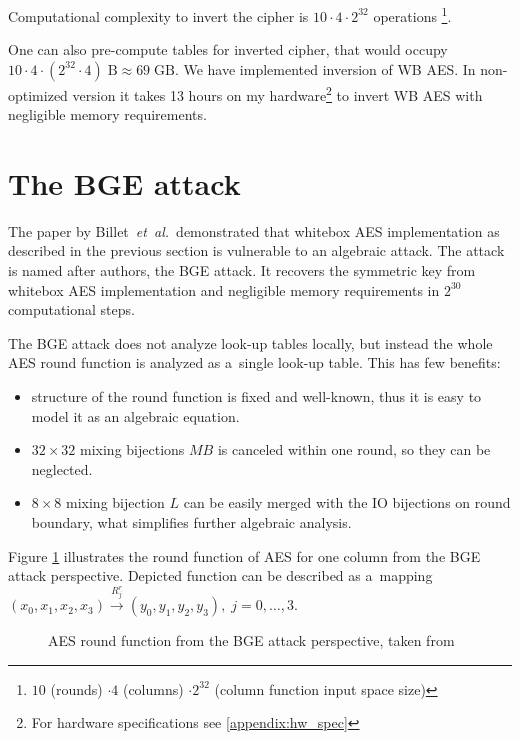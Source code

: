 \documentclass[11pt,oneside,final]{fithesis2}
\newcommand{\eal}{\emph{et~al.}}
\begin{document}
    Computational complexity to invert the cipher
    is $10 \cdot 4 \cdot 2^{32}$ operations \footnote{ $10$ (rounds) $\cdot 4$ (columns) $ \cdot 2^{32}$ (column function input space size)}.
    
    One can also pre-compute tables for inverted cipher, that would occupy $10 \cdot 4 \cdot (2^{32} \cdot 4)\;\text{B} \approx 69\;\text{GB}$.
    We have implemented inversion of WB AES. In non-optimized version it takes 13 hours on my hardware\footnote{For hardware specifications see \ref{appendix:hw_spec}} 
    to invert WB AES with negligible memory requirements.

    \section{The BGE attack}\label{sec:bge_attack}
    The paper \citep{Billet:2004:CWB:2080787.2080809} by Billet~\eal~demonstrated that whitebox AES implementation as described in the previous section is vulnerable
    to an algebraic attack. The attack is named after authors, the BGE attack. It recovers the symmetric key from whitebox AES implementation and
    negligible memory requirements in $2^{30}$ computational steps.
    
    The BGE attack does not analyze look-up tables locally, but instead the whole AES round function is analyzed as a~single look-up table. This has few benefits:
    \begin{itemize}
     \item structure of the round function is fixed and well-known, thus it is easy to model it as an algebraic equation.
     \item $32\times32$ mixing bijections $MB$ is canceled within one round, so they can be neglected.
     \item $8\times8$ mixing bijection $L$ can be easily merged with the IO bijections on round boundary, what simplifies further algebraic analysis. 
    \end{itemize}
    
    Figure \ref{fig:aes_round_bge} illustrates the round function of AES for one column from the BGE attack perspective. Depicted function can 
    be described as a~mapping $\left(x_0, x_1, x_2, x_3\right) \xrightarrow{R^r_j} \left(y_0, y_1, y_2, y_3\right), \; j=0,\dots,3$.   
    
    \begin{figure}
    \begin{center}
    \leavevmode
    \centerline{}
    \end{center}
    \caption{AES round function from the BGE attack perspective, taken from \citep{Billet:2004:CWB:2080787.2080809}}
    \label{fig:aes_round_bge}
    \end{figure} 
\end{document}
